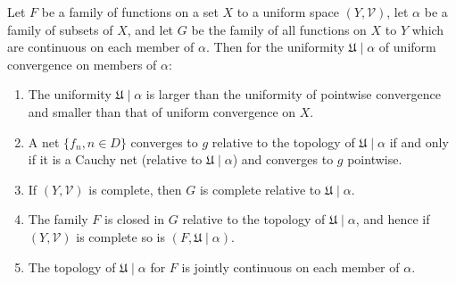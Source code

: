 Let $F$ be a family of functions on a set $X$ to a uniform space $(Y, \mathcal{V})$, let $\alpha$ be a family of subsets of $X$, and let $G$ be the family of all functions on $X$ to $Y$ which are continuous on each member of $\alpha$. Then for the uniformity $\mathfrak{U} \mid \alpha$ of uniform convergence on members of $\alpha$:

\begin{enumerate}
\item[(a)] The uniformity $\mathfrak{U} \mid \alpha$ is larger than the uniformity of pointwise convergence and smaller than that of uniform convergence on $X$.

\item[(b)] A net $\{f_n, n \in D\}$ converges to $g$ relative to the topology of $\mathfrak{U} \mid \alpha$ if and only if it is a Cauchy net (relative to $\mathfrak{U} \mid \alpha$) and converges to $g$ pointwise.

\item[(c)] If $(Y, \mathcal{V})$ is complete, then $G$ is complete relative to $\mathfrak{U} \mid \alpha$.

\item[(d)] The family $F$ is closed in $G$ relative to the topology of $\mathfrak{U} \mid \alpha$, and hence if $(Y, \mathcal{V})$ is complete so is $(F, \mathfrak{U} \mid \alpha)$.

\item[(e)] The topology of $\mathfrak{U} \mid \alpha$ for $F$ is jointly continuous on each member of $\alpha$.
\end{enumerate}

